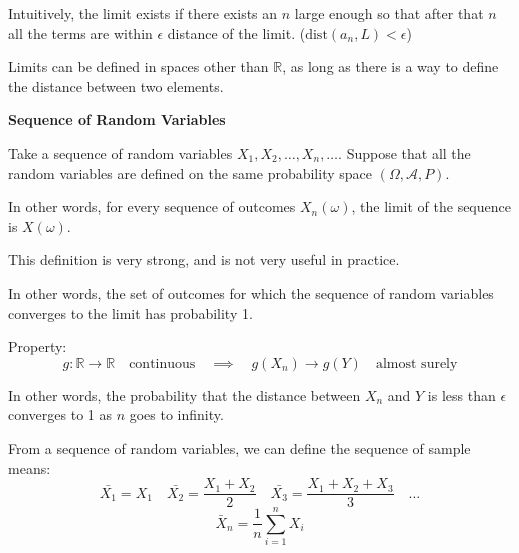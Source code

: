 Intuitively, the limit exists if there exists an $n$ large enough so that after that $n$ all the terms are within $\epsilon$ distance of the limit. ($\text{dist}(a_n, L) < \epsilon$)

Limits can be defined in spaces other than $\mathbb{R}$, as long as there is a way to define the distance between two elements.

\textbf{Sequence of Random Variables}

Take a sequence of random variables $X_1, X_2, \ldots , X_n, \ldots$.
Suppose that all the random variables are defined on the same probability space $(\Omega, \mathcal{A}, P)$.


In other words, for every sequence of outcomes $X_n(\omega)$, the limit of the sequence is $X(\omega)$.

This definition is very strong, and is not very useful in practice.


In other words, the set of outcomes for which the sequence of random variables converges to the limit has probability 1.

Property:
\[
g: \mathbb{R} \to \mathbb{R} \quad \text{continuous} \quad \implies \quad g(X_n) \to g(Y) \quad \text{almost surely}
\]


In other words, the probability that the distance between $X_n$ and $Y$ is less than $\epsilon$ converges to 1 as $n$ goes to infinity.




From a sequence of random variables, we can define the sequence of sample means:
\[
\bar{X_1} = X_1 \quad \bar{X_2} = \frac{X_1 + X_2}{2} \quad \bar{X_3} = \frac{X_1 + X_2 + X_3}{3} \quad \ldots
\]
\[
\bar{X}_n = \frac{1}{n} \sum_{i=1}^{n} X_i
\]

